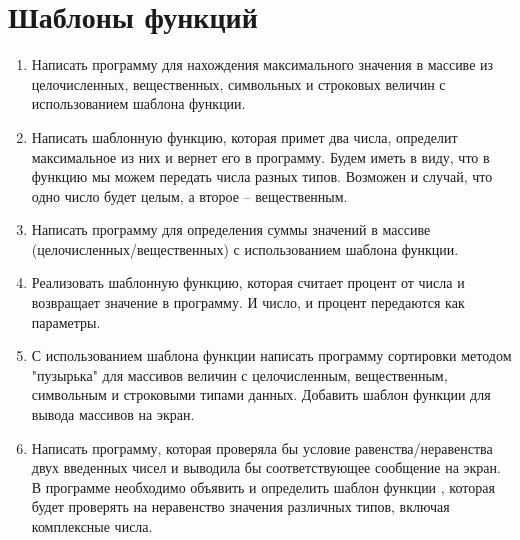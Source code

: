 \section{Шаблоны функций}
\begin{enumerate}[leftmargin=*]
    \item Написать программу для нахождения максимального значения в массиве из целочисленных, вещественных, символьных и строковых величин с использованием шаблона функции.
    \item Написать шаблонную функцию, которая примет два числа, определит максимальное из них и вернет его в программу. Будем иметь в виду, что в функцию мы можем передать числа разных типов. Возможен и случай, что одно число будет целым, а второе – вещественным.
    \item Написать программу для определения суммы значений в массиве (целочисленных/вещественных) с использованием шаблона функции.
    \item Реализовать шаблонную функцию, которая считает процент от числа и возвращает значение в программу. И число, и процент передаются как параметры.
    \item С использованием шаблона функции написать программу сортировки методом "пузырька" для массивов величин с  целочисленным, вещественным, символьным и строковыми типами данных. Добавить шаблон функции для вывода массивов на экран.
    \item Написать программу, которая проверяла бы условие равенства/неравенства двух введенных чисел и выводила бы соответствующее сообщение на экран. В программе необходимо объявить и определить шаблон функции , которая будет проверять на неравенство значения различных типов, включая комплексные числа.
\end{enumerate}

